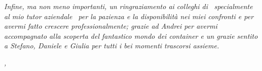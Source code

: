 \noindent \textit{Infine, ma non meno importanti, un ringraziamento ai colleghi di \myCompany\, specialmente al mio tutor aziendale \myTutor\ per la pazienza e la disponibilità nei miei confronti e per avermi fatto crescere professionalmente; grazie ad Andrei per avermi accompagnato alla scoperta del fantastico mondo dei container e un grazie sentito a Stefano, Daniele e Giulia per tutti i bei momenti trascorsi assieme.}\\
\bigskip

\noindent\textit{\myLocation, \myTime}
\hfill \myName

\endgroup

